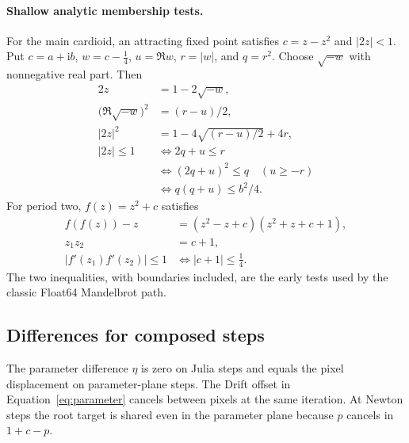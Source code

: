 \documentclass[11pt,a4paper]{article}
\numberwithin{equation}{section}
\newcommand{\abs}[1]{\lvert#1\rvert}
\newcommand{\ii}{\mathrm{i}}
\begin{document}
\paragraph{Shallow analytic membership tests.}
For the main cardioid, an attracting fixed point satisfies
\(c=z-z^2\) and \(\abs{2z}<1\). Put \(c=a+\ii b\),
\(w=c-\tfrac14\), \(u=\Re w\), \(r=\abs w\), and \(q=r^2\).
Choose \(\sqrt{-w}\) with nonnegative real part. Then
\begin{align*}
  2z&=1-2\sqrt{-w},\\
  \big(\Re\sqrt{-w}\big)^2&=(r-u)/2,\\
  \abs{2z}^2&=1-4\sqrt{(r-u)/2}+4r,\\
  \abs{2z}\le1
     &\iff 2q+u\le r\\
     &\iff (2q+u)^2\le q \quad (u\ge-r)\\
     &\iff q(q+u)\le b^2/4 .
\end{align*}
For period two, \(f(z)=z^2+c\) satisfies
\begin{align*}
  f(f(z))-z&=(z^2-z+c)(z^2+z+c+1),\\
  z_1z_2&=c+1,\\
  \abs{f'(z_1)f'(z_2)}\le1
     &\iff\abs{c+1}\le\tfrac14 .
\end{align*}
The two inequalities, with boundaries included, are the early tests
used by the classic Float64 Mandelbrot path.

\subsection{Differences for composed steps}

The parameter difference \(\eta\) is zero on Julia steps and equals
the pixel displacement on parameter-plane steps. The Drift offset
in Equation~\eqref{eq:parameter} cancels between pixels at the same
iteration. At Newton steps the root target is shared even in the
parameter plane because \(p\) cancels in \(1+c-p\).
\end{document}

